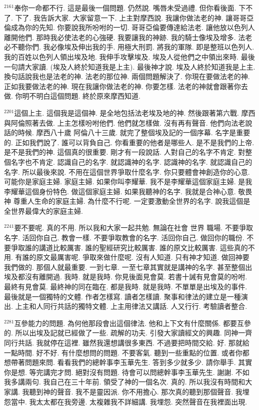 \documentclass{book}
\begin{document}
$^{2161}$奉你一命都不行.
這是最後一個問題.
仍然說.
嘴唇未受過禮.
但你看後面.
下不了.
下了.
我告訴大家.
大家留意一下.
上主對摩西說.
我讓你做法老的神.
讓哥哥亞倫成為你的先知.
你要說我所吩咐的一切.
哥哥亞倫要傳達給法老.
讓他放以色列人離開他們.
那時我必使法老的心強硬.
我要讓我的神跡.
我的騎士像埃及增多.
法老必不聽你們.
我必像埃及伸出我的手.
用極大刑罰.
將我的軍隊.
即是整班以色列人.
我的百姓以色列人領出埃及地.
我伸手攻擊埃及.
埃及人從他們之中領出來時.
最後一句請大家讀.
(埃及人終於知道我是上主).
最後神才說.
埃及人終於知道我是上主.
換句話說我也是法老的神.
法老的那位神.
兩個問題解決了.
你現在要做法老的神.
正如我要做法老的神.
現在我讓你做法老的神.
你要怎樣.
法老的神就會跟著你去做.
你明不明白這個問題.
終於原來摩西知道.

$^{2201}$這個上主.
這個我是這個神.
是全地包括法老埃及地的神.
然後跟著第六戰.
摩西與阿倫照著去做.
上主怎樣吩咐他們.
他們就怎樣做.
沒有再有聲音.
他們向法老說話的時候.
摩西八十歲 阿倫八十三歲.
就完了整個埃及記的一個序幕.
名字是重要的.
正如我們說了.
誰可以背負自己.
你看重要的他者是哪些人.
是不是我們的上帝.
是不是我們的神.
這個真的很重要.
剛才有一段說話.
人對自己的名字不肯定.
對整個名字也不肯定.
認識自己的名字.
就認識神的名字.
認識神的名字.
就認識自己的名字.
所以最後來說.
不用在這個世界爭取什麼名字.
你只要體會神創造你的心意.
可能你是家庭主婦.
家庭主婦.
如果你叫李耀華.
我不是李耀華這個家庭主婦.
是我李耀華這個身份特色.
做這個家庭主婦.
如果我聽神的名字.
我就是合神心意.
敬畏神 尊重人生命的家庭主婦.
為什麼不行呢.
一定要激動全世界的名字.
說我這個是全世界最偉大的家庭主婦.

$^{2241}$要不要呢.
真的不用.
所以我和大家一起共勉.
無論在社會 世界 職場.
不要爭取名字.
活回你自己.
教會一樣.
不要爭取教會的名字.
活回你自己.
做回你的職份.
不要爭取誰的講道比較厲害.
誰的聖經研究比較厲害.
誰的原文比較厲害.
這些真的不用.
有誰的原文最厲害呢.
爭取來做什麼呢.
沒有人知道.
只有神才知道.
做回神要我們做的.
那個人就最重要.
一到七章.
一至七章其實就是講神的名字.
甚至整個出埃及都沒有離開過.
我時.
就是我時.
你見後面見會莫.
若書十誡有見會莫的吩咐.
最終有見會莫.
最終神的同在臨在.
都是我時.
就是我時.
不單單是出埃及的事件.
最後就是一個獨特的文體.
作者怎樣寫.
讀者怎樣讀.
聚事和律法的建立是一種演出.
上主和人同行共話的獨特文體.
上主用律法又講話.
人又行行.
考驗讀者整合.

$^{2281}$互參能力的問題.
為何他那段會出這個律法.
他和上下文有什麼關係.
都要互參的.
所以出埃及記就已經做了一些.
疏解的功夫.
引發大家讀經文的興趣.
同神一齊同行共話.
我就停在這裡.
雖然我還想講很多東西.
不過要把時間交給.
好.
那就給一點時間.
好不好.
有什麼想問的問題.
不要客氣.
聽到一些重點的位置.
或者你都想帶著問題來問.
看看我們的總幹事李玉華先生.
答到多少就多少.
請你舉手.
其實你是想.
等完講完才問.
絕對沒有問題.
待會可以問總幹事李玉華先生.
謝謝.
不如我多講兩句.
我自己在三十年前.
領受了神的一個名次.
真的.
所以我沒有時間和大家講.
我聽到神的聲音.
我不是靈因派.
你不用擔心.
那次真的聽到那個聲音.
我埋怨當中.
我太太都在我旁邊.
太複雜我不詳細講.
我埋怨.
突然聲音在我裡面出現.
\end{document}
